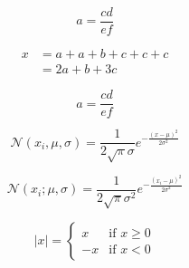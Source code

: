\documentclass{article}
\begin{document}
        \begin{equation*}
            a = \frac{cd}{ef}
        \end{equation*}

        \begin{align}
            x 
            & = a + a + b + c + c + c \nonumber \\
            & =  2a + b + 3c
        \end{align}

        $$a = \frac{cd}{ef}$$

        $$
        \mathcal{N}(x_i, \mu, \sigma) = \frac{1}{2\sqrt{\pi}\sigma} e ^{-\frac{(x-\mu)^{2}}{2\sigma^2}}
        $$

        $$\mathcal{N}(x_i; \mu, \sigma) = \frac{1}{2\sqrt{\pi}\sigma^2} e^{-\frac{(x_i-\mu)^2}{2\sigma^2}}$$


        $$|x| = \begin{cases}
                    x & \text{if } x \geq 0 \\
                    -x & \text{if } x < 0
                \end{cases}$$
\end{document}
